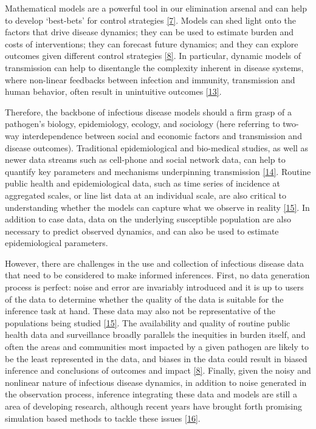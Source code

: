 \documentclass[
  oneside]{book}
\begin{document}
Mathematical models are a powerful tool in our elimination arsenal and can help to develop `best-bets' for control strategies \protect\hyperlink{ref-heesterbeek2015}{{[}7{]}}. Models can shed light onto the factors that drive disease dynamics; they can be used to estimate burden and costs of interventions; they can forecast future dynamics; and they can explore outcomes given different control strategies \protect\hyperlink{ref-lessler2016}{{[}8{]}}. In particular, dynamic models of transmission can help to disentangle the complexity inherent in disease systems, where non-linear feedbacks between infection and immunity, transmission and human behavior, often result in unintuitive outcomes \protect\hyperlink{ref-mahmud2020}{{[}13{]}}.

Therefore, the backbone of infectious disease models should a firm grasp of a pathogen's biology, epidemiology, ecology, and sociology (here referring to two-way interdependence between social and economic factors and transmission and disease outcomes). Traditional epidemiological and bio-medical studies, as well as newer data streams such as cell-phone and social network data, can help to quantify key parameters and mechanisms underpinning transmission \protect\hyperlink{ref-bansal2016}{{[}14{]}}. Routine public health and epidemiological data, such as time series of incidence at aggregated scales, or line list data at an individual scale, are also critical to understanding whether the models can capture what we observe in reality \protect\hyperlink{ref-cauchemez2019}{{[}15{]}}. In addition to case data, data on the underlying susceptible population are also necessary to predict observed dynamics, and can also be used to estimate epidemiological parameters.

However, there are challenges in the use and collection of infectious disease data that need to be considered to make informed inferences. First, no data generation process is perfect: noise and error are invariably introduced and it is up to users of the data to determine whether the quality of the data is suitable for the inference task at hand. These data may also not be representative of the populations being studied \protect\hyperlink{ref-cauchemez2019}{{[}15{]}}. The availability and quality of routine public health data and surveillance broadly parallels the inequities in burden itself, and often the areas and communities most impacted by a given pathogen are likely to be the least represented in the data, and biases in the data could result in biased inference and conclusions of outcomes and impact \protect\hyperlink{ref-lessler2016}{{[}8{]}}. Finally, given the noisy and nonlinear nature of infectious disease dynamics, in addition to noise generated in the observation process, inference integrating these data and models are still a area of developing research, although recent years have brought forth promising simulation based methods to tackle these issues \protect\hyperlink{ref-funk2020}{{[}16{]}}.
\end{document}
